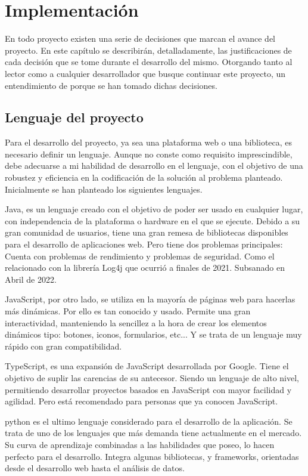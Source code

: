 \chapter{Implementación}
En todo proyecto existen una serie de decisiones que marcan el avance del proyecto. En este capítulo se describirán, detalladamente, las justificaciones de cada decisión que se tome durante el desarrollo del mismo. Otorgando tanto al lector como a cualquier desarrollador que busque continuar este proyecto, un entendimiento de porque se han tomado dichas decisiones.

\section{Lenguaje del proyecto}
Para el desarrollo del proyecto, ya sea una plataforma web o una biblioteca, es necesario definir un lenguaje. Aunque no conste como requisito imprescindible, debe adecuarse a mi habilidad de desarrollo en el lenguaje, con el objetivo de una robustez y eficiencia en la codificación de la solución al problema planteado. Inicialmente se han planteado los siguientes lenguajes.

Java, es un lenguaje creado con el objetivo de poder ser usado en cualquier lugar, con independencia de la plataforma o hardware en el que se ejecute. Debido a su gran comunidad de usuarios, tiene una gran remesa de bibliotecas disponibles para el desarrollo de aplicaciones web. Pero tiene dos problemas principales: Cuenta con problemas de rendimiento y problemas de seguridad. Como el relacionado con la librería Log4j que ocurrió a finales de 2021. Subsanado en Abril de 2022.\cite{cisa}

JavaScript, por otro lado, se utiliza en la mayoría de páginas web para hacerlas más dinámicas. Por ello es tan conocido y usado. Permite una gran interactividad, manteniendo la sencillez a la hora de crear los elementos dinámicos tipo: botones, iconos, formularios, etc... Y se trata de un lenguaje muy rápido con gran compatibilidad.

TypeScript, es una expansión de JavaScript desarrollada por Google. Tiene el objetivo de suplir las carencias de su antecesor. Siendo un lenguaje de alto nivel, permitiendo desarrollar proyectos basados en JavaScript con mayor facilidad y agilidad. Pero está recomendado para personas que ya conocen JavaScript.

\Gls{python} es el ultimo lenguaje considerado para el desarrollo de la aplicación. Se trata de uno de los lenguajes que más demanda tiene actualmente en el mercado. Su curva de aprendizaje combinadas a las habilidades que poseo, lo hacen perfecto para el desarrollo. Integra algunas bibliotecas, y frameworks, orientadas desde el desarrollo web hasta el análisis de datos.

